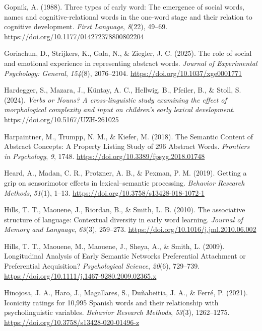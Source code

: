 \documentclass[
  man,floatsintext]{apa6}
\newlength{\cslhangindent}
\newenvironment{CSLReferences}[2] %
 {\begin{list}{}{%
  \setlength{\itemindent}{0pt}
  \setlength{\leftmargin}{0pt}
  \setlength{\parsep}{0pt}
  \ifodd #1
   \setlength{\leftmargin}{\cslhangindent}
   \setlength{\itemindent}{-1\cslhangindent}
  \fi
  \setlength{\itemsep}{#2\baselineskip}}}
 {\end{list}}
\begin{document}
\begin{CSLReferences}{1}{0}
Gopnik, A. (1988). Three types of early word: The emergence of social words, names and cognitive-relational words in the one-word stage and their relation to cognitive development. \emph{First Language}, \emph{8}(22), 49--69. \url{https://doi.org/10.1177/014272378800802204}

Goriachun, D., Strijkers, K., Gala, N., \& Ziegler, J. C. (2025). The role of social and emotional experience in representing abstract words. \emph{Journal of Experimental Psychology: General}, \emph{154}(8), 2076--2104. \url{https://doi.org/10.1037/xge0001771}

Hardegger, S., Mazara, J., Küntay, A. C., Hellwig, B., Pfeiler, B., \& Stoll, S. (2024). \emph{Verbs or {Nouns}? {A} cross-linguistic study examining the effect of morphological complexity and input on children's early lexical development}. \url{https://doi.org/10.5167/UZH-261025}

Harpaintner, M., Trumpp, N. M., \& Kiefer, M. (2018). The {Semantic Content} of {Abstract Concepts}: {A Property Listing Study} of 296 {Abstract Words}. \emph{Frontiers in Psychology}, \emph{9}, 1748. \url{https://doi.org/10.3389/fpsyg.2018.01748}

Heard, A., Madan, C. R., Protzner, A. B., \& Pexman, P. M. (2019). Getting a grip on sensorimotor effects in lexical--semantic processing. \emph{Behavior Research Methods}, \emph{51}(1), 1--13. \url{https://doi.org/10.3758/s13428-018-1072-1}

Hills, T. T., Maouene, J., Riordan, B., \& Smith, L. B. (2010). The associative structure of language: {Contextual} diversity in early word learning. \emph{Journal of Memory and Language}, \emph{63}(3), 259--273. \url{https://doi.org/10.1016/j.jml.2010.06.002}

Hills, T. T., Maouene, M., Maouene, J., Sheya, A., \& Smith, L. (2009). Longitudinal {Analysis} of {Early Semantic Networks Preferential Attachment} or {Preferential Acquisition}? \emph{Psychological Science}, \emph{20}(6), 729--739. \url{https://doi.org/10.1111/j.1467-9280.2009.02365.x}

Hinojosa, J. A., Haro, J., Magallares, S., Duñabeitia, J. A., \& Ferré, P. (2021). Iconicity ratings for 10,995 {Spanish} words and their relationship with psycholinguistic variables. \emph{Behavior Research Methods}, \emph{53}(3), 1262--1275. \url{https://doi.org/10.3758/s13428-020-01496-z}


\end{CSLReferences}
\end{document}
